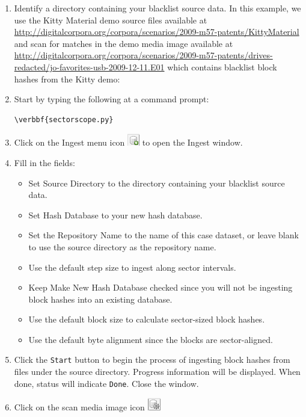 \documentclass[11pt,fleqn]{article} %
\begin{document}
\begin{enumerate}
\item Identify a directory containing your blacklist source data.
In this example, we use the Kitty Material demo source files available at \url{http://digitalcorpora.org/corpora/scenarios/2009-m57-patents/KittyMaterial} and scan for matches in the demo media image available at \url{http://digitalcorpora.org/corpora/scenarios/2009-m57-patents/drives-redacted/jo-favorites-usb-2009-12-11.E01} which contains blacklist block hashes from the Kitty demo:
\item Start \sscope by typing the following at a command prompt:
\begin{Verbatim}[commandchars=\\\{\}]
\verbbf{sectorscope.py}
\end{Verbatim} 
\item Click on the Ingest menu icon 
\includegraphics[scale=.4]{screenshots/ingest_menu_icon}
to open the \sscope Ingest window.
\item Fill in the fields:
  \begin{itemize}
  \item Set Source Directory to the directory containing your blacklist source data.
  \item Set Hash Database to your new hash database.
  \item Set the Repository Name to the name of this case dataset, or leave blank to use the source directory as the repository name.
  \item Use the default step size to ingest along sector intervals.
  \item Keep Make New Hash Database checked since you will not be ingesting block hashes into an existing database.
  \item Use the default block size to calculate sector-sized block hashes.
  \item Use the default byte alignment since the blocks are sector-aligned.
  \end{itemize}
\item Click the \verb+Start+ button to begin the process of ingesting block hashes from files under the source directory. Progress information will be displayed. When done, status will indicate \verb+Done+. Close the window.
\item Click on the scan media image icon
\includegraphics[scale=.4]{screenshots/scan_media_image_icon}

\end{enumerate}
\end{document}
